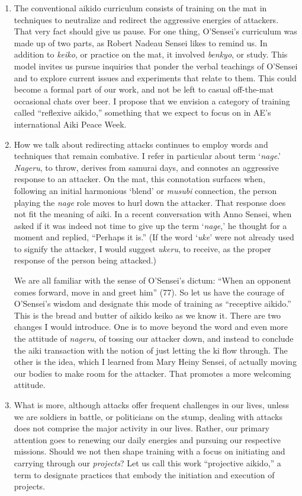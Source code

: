 \begin{enumerate}
\item The conventional aikido curriculum consists of training on the mat in techniques to neutralize and redirect the aggressive energies of attackers. That very fact should give us pause. For one thing, O'Sensei's curriculum was made up of two parts, as Robert Nadeau Sensei likes to remind us. In addition to \emph{keiko}, or practice on the mat, it involved \emph{benkyo}, or study. This model invites us pursue inquiries that ponder the verbal teachings of O'Sensei and to explore current issues and experiments that relate to them. This could become a formal part of our work, and not be left to casual off-the-mat occasional chats over beer. I propose that we envision a category of training called ``reflexive aikido,'' something that we expect to focus on in AE's international Aiki Peace Week.
\item How we talk about redirecting attacks continues to employ words and techniques that remain combative. I refer in particular about term `\emph{nage}.' \emph{Nageru}, to throw, derives from samurai days, and connotes an aggressive response to an attacker. On the mat, this connotation surfaces when, following an initial harmonious `blend' or \emph{musubi} connection, the person playing the \emph{nage} role moves to hurl down the attacker. That response does not fit the meaning of aiki. In a recent conversation with Anno Sensei, when asked if it was indeed not time to give up the term `\emph{nage},' he thought for a moment and replied, ``Perhaps it is.'' (If the word `\emph{uke}' were not already used to signify the attacker, I would suggest \emph{ukeru}, to receive, as the proper response of the person being attacked.) 

We are all familiar with the sense of O'Sensei's dictum: ``When an opponent comes forward, move in and greet him'' (77). So let us have the courage of O'Sensei's wisdom and designate this mode of training as ``receptive aikido.'' This is the bread and butter of aikido keiko as we know it. There are two changes I would introduce. One is to move beyond the word and even more the attitude of \emph{nageru}, of tossing our attacker down, and instead to conclude the aiki transaction with the notion of just letting the ki flow through. The other is the idea, which I learned from Mary Heiny Sensei, of actually moving our bodies to make room for the attacker. That promotes a more welcoming attitude. 
\item What is more, although attacks offer frequent challenges in our lives, unless we are soldiers in battle, or politicians on the stump, dealing with attacks does not comprise the major activity in our lives. Rather, our primary attention goes to renewing our daily energies and pursuing our respective missions. Should we not then shape training with a focus on initiating and carrying through our \emph{projects}? Let us call this work ``projective aikido,'' a term to designate practices that embody the initiation and execution of projects.


\end{enumerate}
